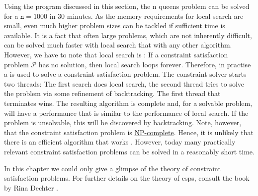 Using the program discussed in this section, the n queens problem can be solved for a $\texttt{n} = 1000$ in
30 minutes.  As the memory requirements for local search are small, even much higher problem sizes can be
tackled if sufficient time is available.  It is a fact that often large problems, which are not inherently
difficult, can be solved much faster with local search that with any other algorithm.  
However, we have to note that local search is :  If a
constraint satisfaction problem $\mathcal{P}$ has no solution, then local search loops forever.  Therefore, in
practise a  is used to solve a constraint satisfaction problem.  The constraint solver
starts two threads: The first search does local search, the second thread tries to solve the problem via some
refinement of backtracking.  The first thread that terminates wins.  The resulting algorithm is complete and,
for a solvable problem, will have a performance that is similar to the performance of local search.  If the
problem is unsolvable, this will   be discovered by backtracking.  Note, however, that the
constraint satisfaction problem is \href{https://en.wikipedia.org/wiki/NP-completeness}{NP-complete}.  Hence,
it is unlikely that there is an efficient algorithm that works .  However, today many practically
relevant constraint satisfaction problems can be solved in a reasonably short time. 

In this chapter we could only give a glimpse of the theory of constraint satisfaction problems.
For further details on the theory of \ac{csp}s, consult the book  by Rina Dechter
\cite{dechter:2003}.

